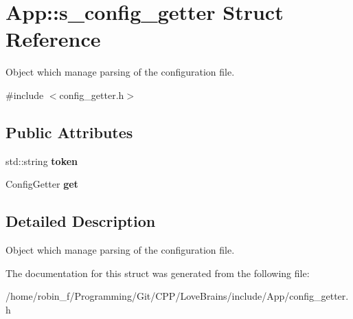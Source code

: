 \section{App\+:\+:s\+\_\+config\+\_\+getter Struct Reference}
\label{struct_app_1_1s__config__getter}


Object which manage parsing of the configuration file.  




{\ttfamily \#include $<$config\+\_\+getter.\+h$>$}

\subsection*{Public Attributes}
\begin{DoxyCompactItemize}
\item 
std\+::string {\bfseries token}\label{struct_app_1_1s__config__getter_a8a49b21359015bf924f84aa250df16a5}

\item 
Config\+Getter {\bfseries get}\label{struct_app_1_1s__config__getter_a0f315890afc418e4992c5b3e5ee1f32a}

\end{DoxyCompactItemize}


\subsection{Detailed Description}
Object which manage parsing of the configuration file. 

The documentation for this struct was generated from the following file\+:\begin{DoxyCompactItemize}
\item 
/home/robin\+\_\+f/\+Programming/\+Git/\+C\+P\+P/\+Love\+Brains/include/\+App/config\+\_\+getter.\+h\end{DoxyCompactItemize}
